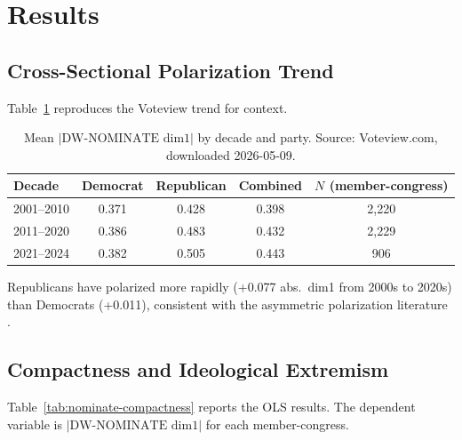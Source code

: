 \section{Results}

\subsection{Cross-Sectional Polarization Trend}

Table~\ref{tab:nominate-trend} reproduces the Voteview trend for context.

\begin{table}[h]
\centering\small
\caption{Mean $|\text{DW-NOMINATE dim1}|$ by decade and party.
Source: Voteview.com, downloaded 2026-05-09.}
\label{tab:nominate-trend}
\begin{tabular}{lcccc}
\toprule
Decade & Democrat & Republican & Combined & $N$ (member-congress) \\
\midrule
2001--2010 & 0.371 & 0.428 & 0.398 & 2{,}220 \\
2011--2020 & 0.386 & 0.483 & 0.432 & 2{,}229 \\
2021--2024 & 0.382 & 0.505 & 0.443 & 906 \\
\bottomrule
\end{tabular}
\end{table}

Republicans have polarized more rapidly (+0.077 abs.\ dim1 from 2000s to 2020s)
than Democrats (+0.011), consistent with the asymmetric polarization literature
\citep{hacker2006off}.

\subsection{Compactness and Ideological Extremism}

Table~\ref{tab:nominate-compactness} reports the OLS results.
The dependent variable is $|\text{DW-NOMINATE dim1}|$ for each member-congress.

